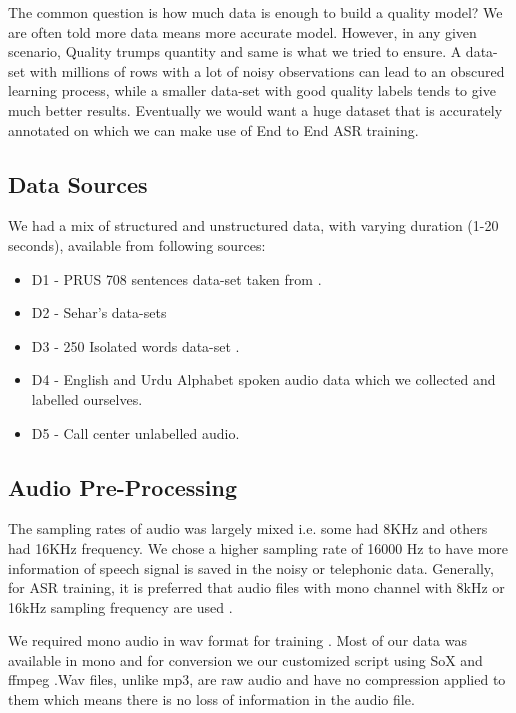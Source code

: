 The common question is how much data is enough to build a quality model? We are often told more data means more accurate model. However, in any given scenario, Quality trumps quantity and same is what we tried to ensure. A data-set with millions of rows with a lot of noisy observations can lead to an obscured learning process, while a smaller data-set with good quality labels tends to give much better results. Eventually we would want a huge dataset that is accurately annotated on which we can make use of End to End ASR training.

\subsection{Data Sources} 
\label{sub:datasources}
We had a mix of structured and unstructured data, with varying duration (1-20 seconds), available from following sources:
\begin{itemize}
    \item D1 - PRUS \cite{zia_pronouncur_2018} 708 sentences data-set taken from \cite{qureshi_urdu_2021}.
    \item D2 - Sehar’s data-sets \cite{sehar_gul_detecting_2020}
    \item D3 - 250 Isolated words data-set \cite{asadullah_automatic_2016} \cite{noauthor_urdu_nodate}. 
    \item D4 - English and Urdu Alphabet spoken audio data which we collected and labelled ourselves.
        \item D5 - Call center unlabelled audio.
\end{itemize}

\subsection{Audio Pre-Processing}

The sampling rates of audio was largely mixed i.e. some had 8KHz and others had 16KHz frequency. We chose a higher sampling rate of 16000 Hz to have more information of speech signal is saved in the noisy or telephonic data. Generally, for ASR training, it is preferred \cite{noauthor_kaldi_nodate} that audio files with mono channel with 8kHz or 16kHz sampling frequency are used \cite{noauthor_why_nodate}. 

We required mono audio in wav format for training \cite{noauthor_kaldi_nodate} \cite{noauthor_why_nodate}. Most of our data was available in mono and for conversion we our customized script using SoX and ffmpeg \cite{noauthor_sox_nodate}.Wav files, unlike mp3, are raw audio and have no compression applied to them which means there is no loss of information in the audio file.

